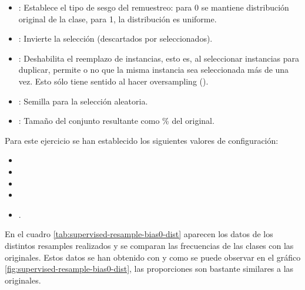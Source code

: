 \begin{itemize}
    \item {}: Establece el tipo de sesgo del remuestreo: para 0 se mantiene distribución original de la clase, para 1, la distribución es uniforme.
    \item {}: Invierte la selección (descartados por seleccionados).
    \item {}: Deshabilita el reemplazo de instancias, esto es, al seleccionar instancias para duplicar, permite o no que la misma instancia sea seleccionada más de una vez. Esto sólo tiene sentido al hacer oversampling ().
    \item {}: Semilla para la selección aleatoria.
    \item {}: Tamaño del conjunto resultante como \% del original.
\end{itemize}

Para este ejercicio se han establecido los siguientes valores de configuración:
\begin {itemize}
    \item {}
    \item {}
    \item {}
    \item {}
    \item {}.
\end{itemize}

En el cuadro \ref{tab:supervised-resample-bias0-dist} aparecen los datos de los distintos resamples realizados y se comparan las frecuencias de las clases con las originales. Estos datos se han obtenido con  y como se puede observar en el gráfico \ref{fig:supervised-resample-bias0-dist}, las proporciones son bastante similares a las originales.

